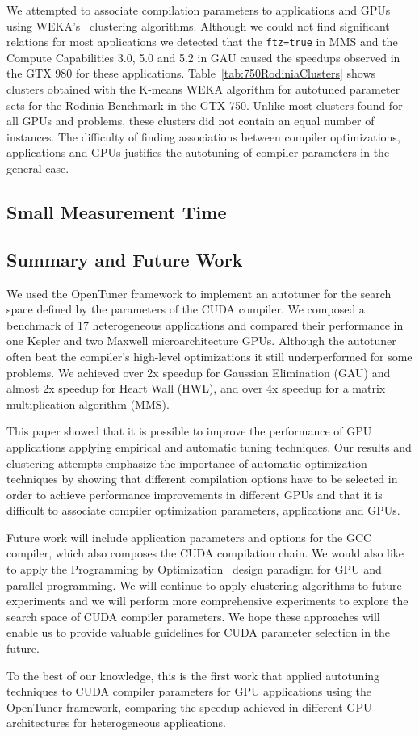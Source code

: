 We attempted to associate compilation parameters to applications and GPUs using
WEKA's~\cite{holmes1994weka} clustering algorithms. Although we could not find
significant relations for most applications we detected that the
\texttt{ftz=true} in MMS and the Compute Capabilities 3.0, 5.0 and 5.2 in GAU
caused the speedups observed in the GTX 980 for these applications.
Table~\ref{tab:750RodiniaClusters} shows clusters obtained with the K-means
WEKA algorithm for autotuned parameter sets for the Rodinia Benchmark in the
GTX 750. Unlike most clusters found for all GPUs and problems, these clusters
did not contain an equal number of instances. The difficulty of finding
associations between compiler optimizations, applications and GPUs justifies
the autotuning of compiler parameters in the general case.


\subsection{Small Measurement Time}
\label{subsec:smalltime}

\subsection{Summary and Future Work}
\label{subsec:GPUconcl}

We used the OpenTuner framework to implement an autotuner for the search space
defined by the parameters of the CUDA compiler. We composed a benchmark of 17
heterogeneous applications and compared their performance in one Kepler and two
Maxwell microarchitecture GPUs.  Although the autotuner often beat the
compiler’s high-level optimizations it still underperformed for some problems.
We achieved over 2x speedup for Gaussian Elimination (GAU) and almost 2x
speedup for Heart Wall (HWL),  and over 4x speedup for a matrix multiplication
algorithm (MMS).

This paper showed that it is possible to improve the performance of GPU
applications applying empirical and automatic tuning techniques. Our results
and clustering attempts emphasize the importance of automatic optimization
techniques by showing that different compilation options have to be selected in
order to achieve performance improvements in different GPUs and that it is
difficult to associate compiler optimization parameters, applications and GPUs.

Future work will include application parameters and options for the GCC
compiler, which also composes the CUDA compilation chain.  We would also like
to apply the Programming by Optimization~\cite{hoos2012programming} design
paradigm for GPU and parallel programming. We will continue to apply clustering
algorithms to future experiments and we will perform more comprehensive
experiments to explore the search space of CUDA compiler parameters. We hope
these approaches will enable us to provide valuable guidelines for CUDA
parameter selection in the future.

To the best of our knowledge, this is the first work that applied autotuning
techniques to CUDA compiler parameters for GPU applications using the OpenTuner
framework, comparing the speedup achieved in different GPU architectures for
heterogeneous applications.

